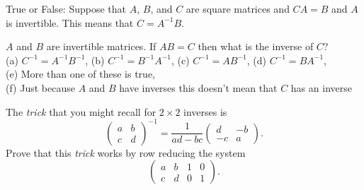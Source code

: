 %     
%  
%             
% 

\begin{problem}
    True or False: Suppose that $A$, $B$, and $C$ are square matrices and $CA = B$ and $A$
    is invertible.  This means that $C = A^{-1} B$.
\end{problem}

%             
% 

\begin{problem}
    $A$ and $B$ are invertible matrices.  If $AB = C$ then what is the inverse of $C$? \\
    (a) $C^{-1} = A^{-1} B^{-1}$, \quad 
    (b) $C^{-1} = B^{-1} A^{-1}$, \quad 
    (c) $C^{-1} = A B^{-1}$, \quad 
    (d) $C^{-1} = B A^{-1}$, \quad \\
    (e) More than one of these is true, \quad \\ (f) Just because $A$ and $B$ have inverses
    this doesn't mean that $C$ has an inverse
\end{problem}

%             

\begin{problem}
The {\it trick} that you might recall for $2\times 2$ inverses is
\[ \begin{pmatrix} a & b \\ c & d \end{pmatrix}^{-1} = \frac{1}{ad-bc} \begin{pmatrix} d &
    -b \\ -c & a \end{pmatrix}. \]
Prove that this {\it trick} works by row reducing the system
\[ \left( \begin{array}{cc|cc} a & b & 1 & 0 \\ c & d & 0 & 1 \end{array} \right). \]
\end{problem}

